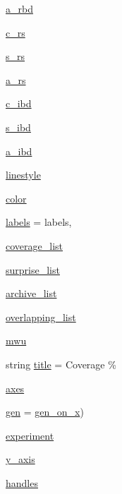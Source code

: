 \begin{DoxyCompactItemize}
\item 
\hyperlink{namespaceplot_ab1a3ba535c3af9d3e6b5864bef55e870}{a\+\_\+rbd}
\item 
\hyperlink{namespaceplot_a11ffc8e0bd5cf08c14af2d5f21b9799c}{c\+\_\+rs}
\item 
\hyperlink{namespaceplot_a138d15f4b1c1cc6f66a5607c60d082d3}{s\+\_\+rs}
\item 
\hyperlink{namespaceplot_ac829d4aed4d7953f398e3b3ee5646aaa}{a\+\_\+rs}
\item 
\hyperlink{namespaceplot_a6bf07b236351e9946de30cab9ac0b971}{c\+\_\+ibd}
\item 
\hyperlink{namespaceplot_a95165b678a27fbbf9c0a1ac8f860b911}{s\+\_\+ibd}
\item 
\hyperlink{namespaceplot_a772a7d8604bf7fa83343f51335aee484}{a\+\_\+ibd}
\item 
\hyperlink{namespaceplot_ad004a8138558b9fe66d0917b7c6a8a4f}{linestyle}
\item 
\hyperlink{namespaceplot_a9b064c75bf32f4c3346c4256e2426b48}{color}
\item 
\hyperlink{namespaceplot_ab032e615e4066fa76e9f5076554291d5}{labels} = labels,
\item 
\hyperlink{namespaceplot_ae49c42f3515337762f5030668d23be2b}{coverage\+\_\+list}
\item 
\hyperlink{namespaceplot_a471eb8bc63560b129861d6d6e1e843cc}{surprise\+\_\+list}
\item 
\hyperlink{namespaceplot_a5bf2b5eb63fe5cd7db4eec777c054477}{archive\+\_\+list}
\item 
\hyperlink{namespaceplot_a2e9180e961dd37bf398b1946263d73b7}{overlapping\+\_\+list}
\item 
\hyperlink{namespaceplot_ac7ba6e498cad457d87d63742238ad0b4}{mwu}
\item 
string \hyperlink{namespaceplot_a510b71690609bcc71ced700548e41d9b}{title} = \textquotesingle{}Coverage \%\textquotesingle{}
\item 
\hyperlink{namespaceplot_a061a30323ef25d1e33063970ee69b9c5}{axes}
\item 
\hyperlink{namespaceplot_a1a657d42091f30a95dc7205dca944fe9}{gen} = \hyperlink{namespaceplot_a468c5b74ef679a33dd8be7bf186e54bf}{gen\+\_\+on\+\_\+x})
\item 
\hyperlink{namespaceplot_a7791746683c1b9f5c4173becf78369de}{experiment}
\item 
\hyperlink{namespaceplot_ada2789a07693a357434a610f6dd9bbd2}{y\+\_\+axis}
\item 
\hyperlink{namespaceplot_aa248fd817363e30220a778ff967b4797}{handles}

\end{DoxyCompactItemize}
